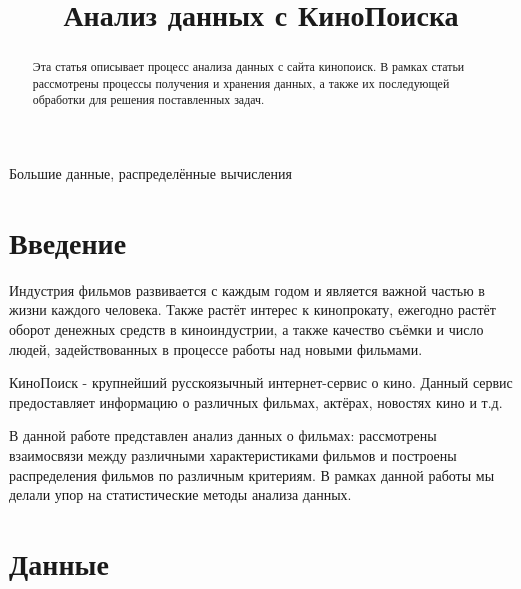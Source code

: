 \documentclass[9pt,conference]{IEEEtran}
\begin{document}
\title{Анализ данных с КиноПоиска}

\author{
}

\maketitle

\begin{abstract}
Эта статья описывает процесс анализа данных с сайта кинопоиск. В рамках статьи рассмотрены процессы получения и хранения данных, а также их последующей обработки для решения поставленных задач.
\end{abstract}

\begin{IEEEkeywords}
Большие данные, распределённые вычисления
\end{IEEEkeywords}

\section{Введение}

Индустрия фильмов развивается с каждым годом и является важной частью в жизни каждого человека. Также растёт интерес к кинопрокату, ежегодно растёт оборот денежных средств в киноиндустрии, а также качество съёмки и число людей, задействованных в процессе работы над новыми фильмами.

КиноПоиск - крупнейший русскоязычный интернет-сервис о кино. Данный сервис предоставляет информацию о различных фильмах, актёрах, новостях кино и т.д.

В данной работе представлен анализ данных о фильмах: рассмотрены взаимосвязи между 
различными характеристиками фильмов и построены распределения фильмов по различным критериям. В рамках данной работы мы делали упор на статистические методы анализа данных.

\section{Данные}
\end{document}
